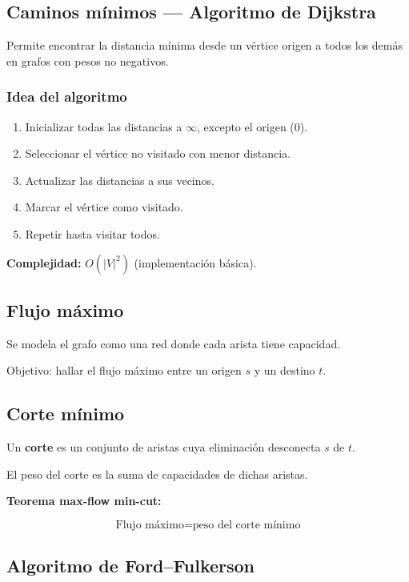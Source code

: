 \documentclass[12pt]{article}
\theoremstyle{plain}
\theoremstyle{definition}
\theoremstyle{remark}
\begin{document}
\subsection*{Caminos mínimos — Algoritmo de Dijkstra}

Permite encontrar la distancia mínima desde un vértice origen a todos los demás en grafos con pesos no negativos.

\subsubsection*{Idea del algoritmo}

\begin{enumerate}
    \item Inicializar todas las distancias a $\infty$, excepto el origen ($0$).
    \item Seleccionar el vértice no visitado con menor distancia.
    \item Actualizar las distancias a sus vecinos.
    \item Marcar el vértice como visitado.
    \item Repetir hasta visitar todos.
\end{enumerate}

\textbf{Complejidad:} $O(|V|^2)$ (implementación básica).

\subsection*{Flujo máximo}

Se modela el grafo como una red donde cada arista tiene capacidad.

Objetivo: hallar el flujo máximo entre un origen $s$ y un destino $t$.

\subsection*{Corte mínimo}

Un \textbf{corte} es un conjunto de aristas cuya eliminación desconecta $s$ de $t$.

El peso del corte es la suma de capacidades de dichas aristas.

\textbf{Teorema max-flow min-cut:}

\[
\text{Flujo máximo} = \text{peso del corte mínimo}
\]

\subsection*{Algoritmo de Ford–Fulkerson}
\end{document}
